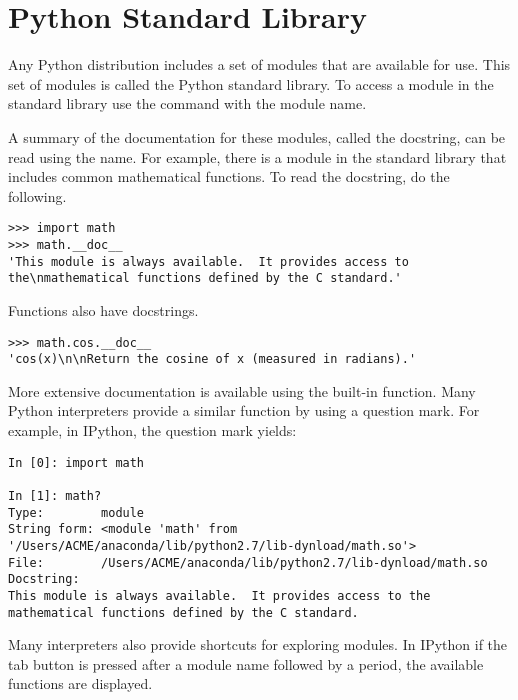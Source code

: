 \section*{Python Standard Library}

Any Python distribution includes a set of modules that are available for use.
This set of modules is called the Python standard library.
To access a module in the standard library use the  command with the module name.

A summary of the documentation for these modules, called the docstring, can be read using the  name.
For example, there is a  module in the standard library that includes common mathematical functions.
To read the docstring, do the following.
\begin{lstlisting}
>>> import math
>>> math.__doc__
'This module is always available.  It provides access to the\nmathematical functions defined by the C standard.'
\end{lstlisting}
Functions also have docstrings.
\begin{lstlisting}
>>> math.cos.__doc__
'cos(x)\n\nReturn the cosine of x (measured in radians).'
\end{lstlisting}

More extensive documentation is available using the  built-in function.
Many Python interpreters provide a similar function by using a question mark.
For example, in IPython, the question mark yields:

\begin{lstlisting}
In [0]: import math

In [1]: math?
Type:        module
String form: <module 'math' from '/Users/ACME/anaconda/lib/python2.7/lib-dynload/math.so'>
File:        /Users/ACME/anaconda/lib/python2.7/lib-dynload/math.so
Docstring:
This module is always available.  It provides access to the
mathematical functions defined by the C standard.
\end{lstlisting}

Many interpreters also provide shortcuts for exploring modules.
In IPython if the tab button is pressed after a module name followed by a period, the available functions are displayed.


